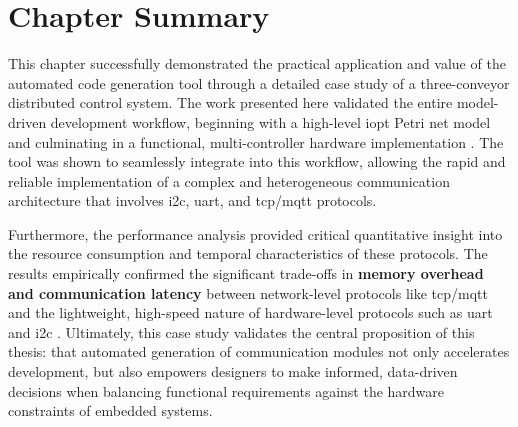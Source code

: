 
\section{Chapter Summary}
\label{sec:case_study_summary}

This chapter successfully demonstrated the practical application and value of the automated code generation tool through a detailed case study of a three-conveyor distributed control system. The work presented here validated the entire model-driven development workflow, beginning with a high-level \gls{iopt} Petri net model and culminating in a functional, multi-controller hardware implementation . The tool was shown to seamlessly integrate into this workflow, allowing the rapid and reliable implementation of a complex and heterogeneous communication architecture that involves \gls{i2c}, \gls{uart}, and \gls{tcp}/\gls{mqtt} protocols.

Furthermore, the performance analysis provided critical quantitative insight into the resource consumption and temporal characteristics of these protocols. The results empirically confirmed the significant trade-offs in \textbf{memory overhead and communication latency} between network-level protocols like \gls{tcp}/\gls{mqtt} and the lightweight, high-speed nature of hardware-level protocols such as \gls{uart} and \gls{i2c} . Ultimately, this case study validates the central proposition of this thesis: that automated generation of communication modules not only accelerates development, but also empowers designers to make informed, data-driven decisions when balancing functional requirements against the hardware constraints of embedded systems.